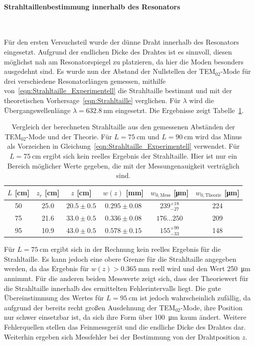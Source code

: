 \documentclass[a4paper,twoside,final]{article}
\begin{document}
\paragraph{Strahltaillenbestimmung innerhalb des Resonators}$~$

Für den ersten Versuchsteil wurde der dünne Draht innerhalb des Resonators eingesetzt. Aufgrund der endlichen Dicke des Drahtes ist es sinnvoll, diesen möglichst nah am Resonatorspiegel zu platzieren, da hier die Moden besonders ausgedehnt sind. Es wurde nun der Abstand der Nullstellen der TEM$_{02}$-Mode für drei verschiedene Resonatorlängen gemessen, mithilfe von~\eqref{eqn:Strahltaille_Experimentell} die Strahltaille bestimmt und mit der theoretischen Vorhersage~\eqref{eqn:Strahltaille} verglichen. Für $\lambda$ wird die Übergangswellenlänge $\lambda = \SI{632.8}{\nano\metre}$ eingesetzt. Die Ergebnisse zeigt Tabelle~\ref{tab:Strahltaille_innerhalb}.

\begin{table}[htp]
  \centering
  \caption{Vergleich der berechneten Strahltaille aus den gemessenen Abständen der TEM$_{02}$-Mode und der Theorie. Für $L=\SI{75}{\centi\metre}$ und $L=\SI{90}{\centi\metre}$ wird das Minus als Vorzeichen in Gleichung~\eqref{eqn:Strahltaille_Experimentell} verwendet. Für $L=\SI{75}{\centi\metre}$ ergibt sich kein reelles Ergebnis der Strahltaille. Hier ist nur ein Bereich möglicher Werte gegeben, die mit der Messungenauigkeit verträglich sind.}
  \begin{tabular}{c c c c c c}
    \toprule
    $L$ [\si{\centi\metre}] & $z_r$ [\si{\centi\metre}] &$z$ [\si{\centi\metre}]  &  $w(z)$ [\si{\milli\metre}] & $w_{0,\text{Mess}}$ [\si{\micro\metre}] & $w_{0,\text{Theorie}}$ [\si{\micro\metre}]\\
    \midrule
    50 & 25.0 & $20.5\pm 0.5$ & $0.295 \pm 0.08$ & $239_{-27}^{+18}$  & 224\\
    75 & 21.6 & $33.0\pm 0.5$ & $0.336 \pm 0.08$ & $176\hdots250$& 209\\
    95 & 10.9 & $43.0\pm 0.5$ & $0.578 \pm 0.15$ & $155_{-33}^{+90}$ & 148\\
    \bottomrule
  \end{tabular}
  \label{tab:Strahltaille_innerhalb}
\end{table}



Für $L = \SI{75}{\centi\metre}$ ergibt sich in der Rechnung kein reelles Ergebnis für die Strahltaille. Es kann jedoch eine obere Grenze für die Strahltaille angegeben werden, da das Ergebnis für $w(z) > \SI{0.365}{\milli\metre}$ reell wird und den Wert \SI{250}{\micro\metre} annimmt. Für die anderen beiden Messwerte zeigt sich, dass der Theoriewert für die Strahltaille innerhalb des ermittelten Fehlerintervalls liegt. Die gute Übereinstimmung des Wertes für $L = \SI{95}{\centi\metre}$ ist jedoch wahrscheinlich zufällig, da aufgrund der bereits recht großen Ausdehnung der TEM$_{02}$-Mode, ihre Position nur schwer einsetzbar ist, da sich ihre Form über \SI{100}{\micro\metre} kaum ändert. Weitere Fehlerquellen stellen das Feinmessgerät und die endliche Dicke des Drahtes dar. Weiterhin ergeben sich Messfehler bei der Bestimmung von der Drahtposition $z$.
\end{document}
